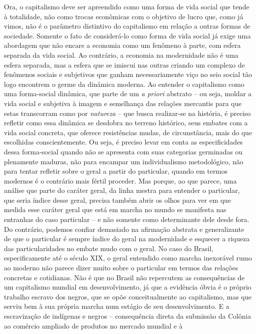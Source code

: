 Ora, o capitalismo deve ser apreendido como uma forma de vida social que
tende à totalidade, não como trocas econômicas com o objetivo de lucro
que, como já vimos, não é o parâmetro distintivo do capitalismo em
relação a outras formas de sociedade. Somente o fato de considerá-lo
como forma de vida social já exige uma abordagem que não encare a
economia como um fenômeno à parte, com esfera separada da vida social.
Ao contrário, a economia na modernidade não é uma esfera separada, mas a
esfera que se imiscui nas outras criando um complexo de fenômenos
sociais e subjetivos que ganham necessariamente viço no seio social tão
logo encontrem o germe da dinâmica moderna. Ao entender o capitalismo
como uma forma-social dinâmica, que parte de um \emph{a priori} abstrato
-- ou seja, moldar a vida social e subjetiva à imagem e semelhança das
relações mercantis para que estas transcorram como por \emph{natureza}
-- que busca realizar-se na história, é preciso refletir como essa
dinâmica se desdobra no terreno histórico, seus embates com a vida
social concreta, que oferece resistências mudas, de circunstância, mais
do que escolhidas conscientemente. Ou seja, é preciso levar em conta as
especificidades dessa forma-social quando não se apresenta com suas
categorias germinadas ou plenamente maduras, não para encampar um
individualismo metodológico, não para tentar refletir sobre o geral a
partir do particular, quando em termos modernos é o contrário mais
fértil proceder. Mas porque, ao que parece, uma análise que parte do
caráter geral, da linha mestra para entender o particular, que seria
índice desse geral, precisa também abrir os olhos para ver em que medida
esse caráter geral que está em marcha no mundo se manifesta nas
entranhas do caso particular -- e não somente como determinante dele
desde fora. Do contrário, podemos confiar demasiado na afirmação
abstrata e generalizante de que o particular é sempre índice do geral na
modernidade e esquecer a riqueza das particularidades no embate mudo com
o geral. No caso do Brasil, especificamente até o século XIX, o geral
entendido como marcha inexorável rumo ao moderno não parece dizer muito
sobre o particular em termos das relações concretas e cotidianas. Não é
que no Brasil não repercutem as consequências de um capitalismo mundial
em desenvolvimento, já que a evidência óbvia é o próprio trabalho
escravo dos negros, que se opõe conceitualmente ao capitalismo, mas que
serviu bem à sua própria marcha num estágio de seu desenvolvimento. E a
escravização de indígenas e negros -- consequência direta da submissão
da Colônia ao comércio ampliado de produtos no mercado mundial e à
